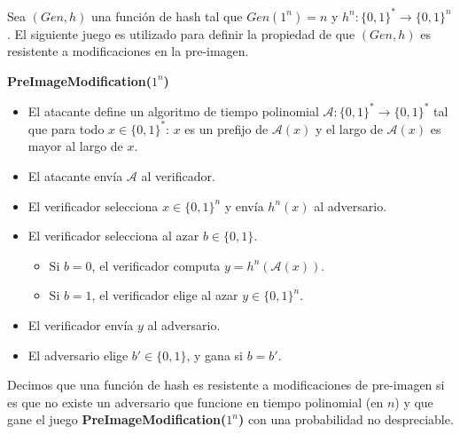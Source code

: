 
Sea $(\textit{Gen}, h)$ una función de hash tal que $\textit{Gen}(1^n) = n$ y  $h^n : \{0,1\}^* \to \{0,1\}^n$. El siguiente juego es utilizado para definir la propiedad de que $(\textit{Gen}, h)$ es resistente a modificaciones en la pre-imagen.

{\bf PreImageModification($1^n$)}
\begin{itemize}
\item El atacante define un algoritmo de tiempo polinomial $\mathcal{A}:\{0,1\}^*\rightarrow\{0,1\}^*$ tal que para todo $x \in \{0,1\}^*$: $x$ es un prefijo de $\mathcal{A}(x)$ y el largo de $\mathcal{A}(x)$ es mayor al largo de $x$.
\item El atacante envía $\mathcal{A}$ al verificador.
\item El verificador selecciona $x\in\{0, 1\}^n$ y envía $h^n(x)$ al adversario.
\item El verificador selecciona al azar $b\in\{0, 1\}$.
\begin{itemize}
\item Si $b=0$, el verificador computa $y=h^n(\mathcal{A}(x))$.
\item Si $b=1$, el verificador elige al azar $y\in\{0,1\}^n$.
\end{itemize}
\item El verificador envía $y$ al adversario.
\item El adversario elige $b'\in\{0,1\}$, y gana si $b=b'$.
\end{itemize}
Decimos que una función de hash es resistente a modificaciones de pre-imagen si es que no existe un adversario que funcione en tiempo polinomial (en $n$) y que gane el juego {\bf PreImageModification($1^n$)} con una probabilidad no despreciable.
